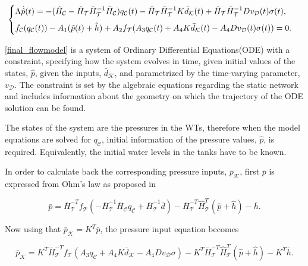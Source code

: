 \begin{equation}
\label{final_flowmodel}
\begin{cases}
    \Lambda \dot{\hat{p}}(t) = - (\hat{H}_{\mathcal{C}} - \hat{H}_{\mathcal{T}} \bar{H}^{-1}_{\mathcal{T}}\bar{H}_{\mathcal{C}})  q_\mathcal{C}(t)  - \hat{H}_{\mathcal{T}} \bar{H}^{-1}_{\mathcal{T}} K \bar{d}_{\mathcal{K}}(t) + \hat{H}_{\mathcal{T}} \bar{H}^{-1}_{\mathcal{T}} D v_{\mathcal{D}}(t) \sigma(t), \vspace{2mm}\\
    f_{\mathcal{C}}(q_\mathcal{C}(t)) - A_1(\hat{p}(t) + \hat{h}) + A_2 f_{\mathcal{T}}(A_3 q_\mathcal{C}(t) + A_4 K \bar{d}_{\mathcal{K}}(t) - A_4 D v_{\mathcal{D}}(t) \sigma(t)) = 0.
\end{cases}
\end{equation}

\eqref{final_flowmodel} is a system of Ordinary Differential Equations(ODE) with a constraint, specifying how the system evolves in time, given initial values of the states, $\hat{p}$, given the inputs, $\bar{d}_{\mathcal{K}}$, and parametrized by the time-varying parameter, $v_{\mathcal{D}}$. The constraint is set by the algebraic equations regarding the static network and includes information about the geometry on which the trajectory of the ODE solution can be found. 

The states of the system are the pressures in the WTs, therefore when the model equations are solved for $q_\mathcal{C}$, initial information of the pressure values, $\hat{p}$, is required. Equivalently, the initial water levels in the tanks have to be known. 

In order to calculate back the corresponding pressure inputs, $\bar{p}_{\mathcal{K}}$, first $\bar{p}$ is expressed from Ohm's law as proposed in 

\begin{equation}
  \label{non-inlet_p_WT}
  \bar{p} =  \bar{H}^{-T}_{\mathcal{T}}f_{\mathcal{T}}(-\bar{H}^{-1}_{\mathcal{T}} \bar{H}_{\mathcal{C}} q_\mathcal{C} + \bar{H}^{-1}_{\mathcal{T}} \bar{d}) - \bar{H}^{-T}_{\mathcal{T}}\hat{H}^{T}_{\mathcal{T}} (\hat{p} + \hat{h}) - \bar{h} .
\end{equation}

Now using that $\bar{p}_{\mathcal{K}} = K^T \bar{p} $, the pressure input equation becomes

\begin{equation}
  \label{non-inlet_p_WT1}
  \bar{p}_{\mathcal{K}} = K^T \bar{H}^{-T}_{\mathcal{T}}f_{\mathcal{T}}(A_3 q_\mathcal{C} + A_4 K \bar{d}_{\mathcal{K}} - A_4 D v_{\mathcal{D}} \sigma) - K^T\bar{H}^{-T}_{\mathcal{T}}\hat{H}^{T}_{\mathcal{T}} (\hat{p} + \hat{h}) - K^T\bar{h} .
\end{equation}

